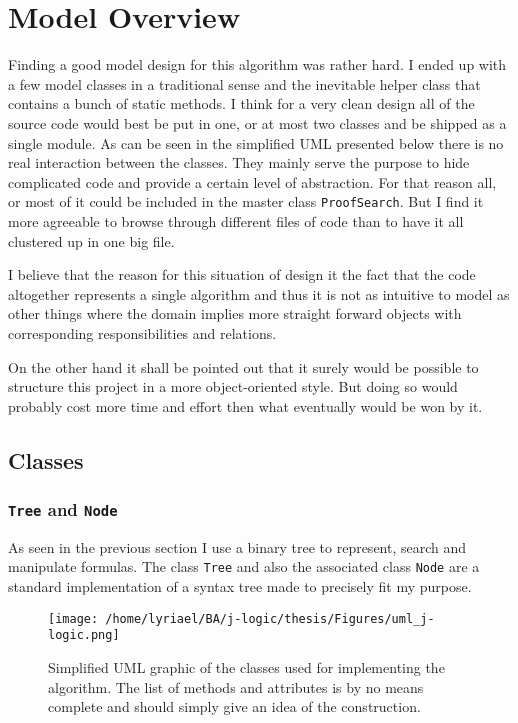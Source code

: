 \section{Model Overview}
Finding a good model design for this algorithm was rather hard. I ended up with a few model classes in a traditional sense and the inevitable helper class that contains a bunch of static methods. I think for a very clean design all of the source code would best be put in one, or at most two classes and be shipped as a single module. As can be seen in the simplified UML presented below there is no real interaction between the classes. They mainly serve the purpose to hide complicated code and provide a certain level of abstraction. For that reason all, or most of it could be included in the master class \texttt{ProofSearch}. But I find it more agreeable to browse through different files of code than to have it all clustered up in one big file.

I believe that the reason for this situation of design it the fact that the code altogether represents a single algorithm and thus it is not as intuitive to model as other things where the domain implies more straight forward objects with corresponding responsibilities and relations.

On the other hand it shall be pointed out that it surely would be possible to structure this project in a more object-oriented style. But doing so would probably cost more time and effort then what eventually would be won by it.

\subsection{Classes}

\subsubsection[Tree and Node]{\texttt{Tree} and \texttt{Node}}
As seen in the previous section I use a binary tree to represent, search and manipulate formulas. The class \texttt{Tree} and also the associated class \texttt{Node} are a standard implementation of a syntax tree made to precisely fit my purpose. 

\begin{figure}[H]
	\texttt{[image: /home/lyriael/BA/j-logic/thesis/Figures/uml\_j-logic.png]}
	\caption{Simplified UML graphic of the classes used for implementing the algorithm. The list of methods and attributes is by no means complete and should simply give an idea of the construction.}
	\label{uml}
\end{figure}


